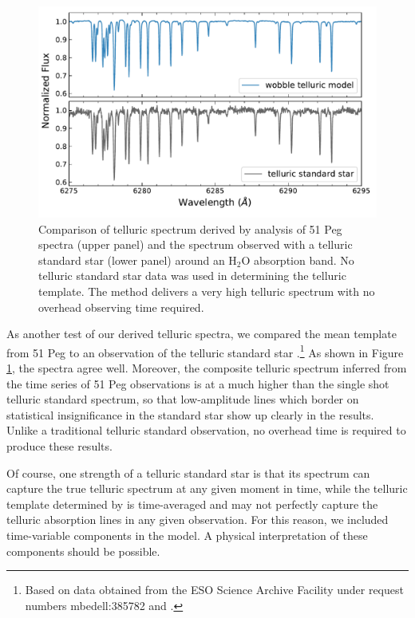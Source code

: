 \documentclass[modern]{aastex62}
\begin{document}
{\begin{figure}
\centering
\includegraphics[width=5in]{telluric_standard}
\caption{Comparison of telluric spectrum derived by \wobble analysis of 51 Peg spectra (upper panel) and the spectrum observed with a telluric standard star (lower panel) around an H$_2$O absorption band. No telluric standard star data was used in determining the \wobble telluric template. The \wobble method delivers a very high \SNR telluric spectrum with no overhead observing time required.}
\label{fig:telluric_standard}
\end{figure}

As another test of our derived telluric spectra, we compared the mean template from 51 Peg to an observation of the telluric standard star .\footnote{Based on data obtained from the ESO Science Archive Facility under request numbers mbedell:385782 and .}
As shown in Figure \ref{fig:telluric_standard}, the spectra agree well. 
Moreover, the composite telluric spectrum inferred from the time series of 51 Peg observations is at a much higher \SNR than the single shot telluric standard spectrum, so that low-amplitude lines which border on statistical insignificance in the standard star show up clearly in the \wobble results. 
Unlike a traditional telluric standard observation, no overhead time is required to produce these results.

Of course, one strength of a telluric standard star is that its spectrum can capture the true telluric spectrum at any given moment in time, while the telluric template determined by \wobble is time-averaged and may not perfectly capture the telluric absorption lines in any given observation. 
For this reason, we included time-variable components in the model. 
A physical interpretation of these components should be possible.

}
\end{document}
